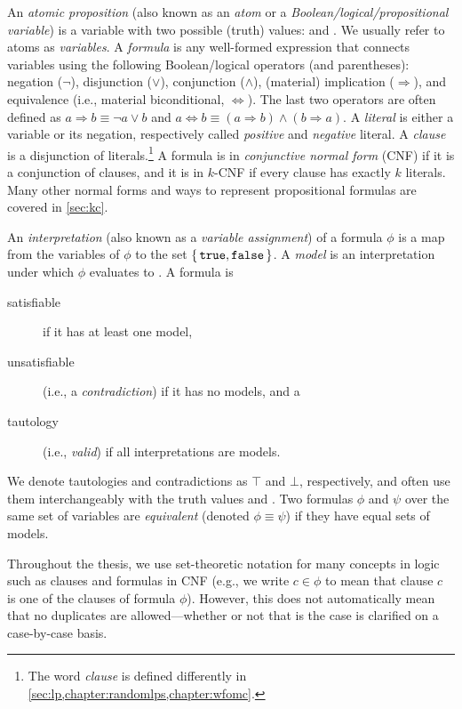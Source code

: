 An \emph{atomic proposition} (also known as an \emph{atom} or a
\emph{Boolean/logical/propositional variable}) is a variable with two possible
(truth) values: \true{} and \false{}. We usually refer to atoms as
\emph{variables}. A \emph{formula} is any well-formed expression that connects
variables using the following Boolean/logical operators (and parentheses):
negation ($\neg$), disjunction ($\lor$), conjunction ($\land$), (material)
implication ($\Rightarrow$), and equivalence (i.e., material biconditional,
$\Leftrightarrow$). The last two operators are often defined as
$a \Rightarrow b \equiv \neg a \lor b$ and
$a \Leftrightarrow b \equiv (a \Rightarrow b) \land (b \Rightarrow a)$. A
\emph{literal} is either a variable or its negation, respectively called
\emph{positive} and \emph{negative} literal. A \emph{clause} is a disjunction of
literals.\footnote{The word \emph{clause} is defined differently in
  \cref{sec:lp,chapter:randomlps,chapter:wfomc}.} A formula is in
\emph{conjunctive normal form} (CNF) if it is a conjunction of clauses, and it
is in $k$-CNF if every clause has exactly $k$ literals. Many other normal forms
and ways to represent propositional formulas are covered in \cref{sec:kc}.

An \emph{interpretation} (also known as a \emph{variable assignment}) of a
formula $\phi$ is a map from the variables of $\phi$ to the set
$\{\, \texttt{true}{}, \texttt{false}{} \,\}$. A \emph{model} is an interpretation under which
$\phi$ evaluates to \true{}. A formula is
\begin{description}
\item[satisfiable] if it has at least one model,
\item[unsatisfiable] (i.e., a \emph{contradiction}) if it has no models, and a
\item[tautology] (i.e., \emph{valid}) if all interpretations are models.
\end{description}
We denote tautologies and contradictions as $\top$ and $\bot$, respectively, and
often use them interchangeably with the truth values \true{} and \false{}. Two
formulas $\phi$ and $\psi$ over the same set of variables are \emph{equivalent}
(denoted $\phi \equiv \psi$) if they have equal sets of models.

Throughout the thesis, we use set-theoretic notation for many concepts in logic
such as clauses and formulas in CNF (e.g., we write $c \in \phi$ to mean that
clause $c$ is one of the clauses of formula $\phi$). However, this does not
automatically mean that no duplicates are allowed---whether or not that is the
case is clarified on a case-by-case basis.

